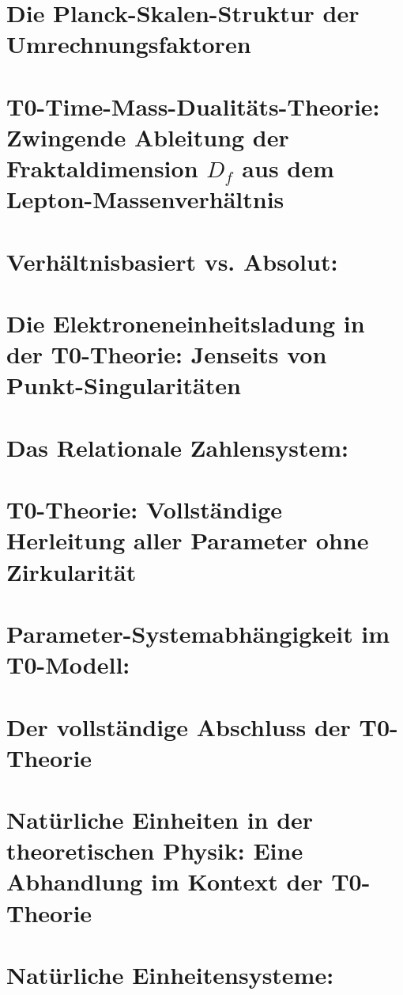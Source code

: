 	\chapter{Die Planck-Skalen-Struktur der Umrechnungsfaktoren}
	
	\chapter{T0-Time-Mass-Dualitäts-Theorie: Zwingende Ableitung der Fraktaldimension $D_f$ aus dem Lepton-Massenverhältnis}
	
	\chapter{Verhältnisbasiert vs. Absolut:}
	
	\chapter{Die Elektroneneinheitsladung in der T0-Theorie: Jenseits von Punkt-Singularitäten}
	
	\chapter{Das Relationale Zahlensystem:}
	
	\chapter{T0-Theorie: Vollständige Herleitung aller Parameter ohne Zirkularität}
	
	\chapter{Parameter-Systemabhängigkeit im T0-Modell:}
	
	\chapter{Der vollständige Abschluss der T0-Theorie}
	
	\chapter{Natürliche Einheiten in der theoretischen Physik: Eine Abhandlung im Kontext der T0-Theorie}
	
	\chapter{Natürliche Einheitensysteme:}
	
